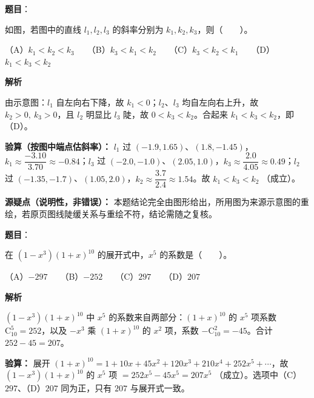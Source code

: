 \begin{answer}

\textbf{题目}：

如图，若图中的直线 $l_1,l_2,l_3$ 的斜率分别为 $k_1,k_2,k_3$，则\mbox{（　　）}。
\nopagebreak[4]
\begin{center}\end{center}
\nopagebreak[4]
（A）$k_1<k_2<k_3$　　（B）$k_3<k_1<k_2$　　（C）$k_3<k_2<k_1$　　（D）$k_1<k_3<k_2$

\textbf{解析}

由示意图：$l_1$ 自左向右下降，故 $k_1<0$；$l_2$、$l_3$ 均自左向右上升，故 $k_2>0,\ k_3>0$，且 $l_2$ 明显比 $l_3$ 陡，故 $0<k_3<k_2$。合起来 $k_1<k_3<k_2$，即（D）。

\textbf{验算（按图中端点估斜率）：} $l_1$ 过 $(-1.9,1.65)$、$(1.8,-1.45)$，$k_1\approx\dfrac{-3.10}{3.70}\approx-0.84$；$l_3$ 过 $(-2.0,-1.0)$、$(2.05,1.0)$，$k_3\approx\dfrac{2.0}{4.05}\approx0.49$；$l_2$ 过 $(-1.35,-1.7)$、$(1.05,2.0)$，$k_2\approx\dfrac{3.7}{2.4}\approx1.54$。故 $k_1<k_3<k_2$ （成立）。

\textbf{源疑点（说明性，非错误）：} 本题结论完全由图形给出，所用图为来源示意图的重绘，若原页图线陡缓关系与重绘不符，结论需随之复核。


\par\medskip

\end{answer}
\begin{answer}

\textbf{题目}：

在 $(1-x^3)(1+x)^{10}$ 的展开式中，$x^5$ 的系数是\mbox{（　　）}。

（A）$-297$　　（B）$-252$　　（C）$297$　　（D）$207$

\textbf{解析}

$(1-x^3)(1+x)^{10}$ 中 $x^5$ 的系数来自两部分：$(1+x)^{10}$ 的 $x^5$ 项系数 $\mathrm C_{10}^{5}=252$，以及 $-x^3$ 乘 $(1+x)^{10}$ 的 $x^2$ 项，系数 $-\mathrm C_{10}^{2}=-45$。合计 $252-45=207$。

\textbf{验算：} 展开 $(1+x)^{10}=1+10x+45x^2+120x^3+210x^4+252x^5+\cdots$，故 $(1-x^3)(1+x)^{10}$ 的 $x^5$ 项 $=252x^5-45x^5=207x^5$ （成立）。选项中（C）$297$、（D）$207$ 同为正，只有 $207$ 与展开式一致。


\par\medskip

\end{answer}
